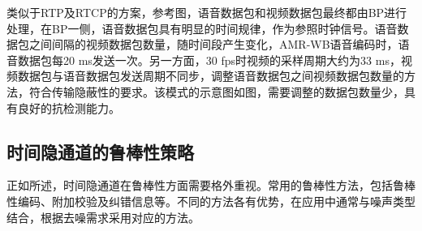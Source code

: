 类似于RTP及RTCP的方案，参考图，语音数据包和视频数据包最终都由BP进行处理，在BP一侧，语音数据包具有明显的时间规律，作为参照时钟信号。语音数据包之间间隔的视频数据包数量，随时间段产生变化，AMR-WB语音编码时，语音数据包每20 ms发送一次。另一方面，30 fps时视频的采样周期大约为33 ms，视频数据包与语音数据包发送周期不同步，调整语音数据包之间视频数据包数量的方法，符合传输隐蔽性的要求。该模式的示意图如图，需要调整的数据包数量少，具有良好的抗检测能力。

\subsection{时间隐通道的鲁棒性策略}
\label{chap:backinfo:ctc:robustness}
正如所述，时间隐通道在鲁棒性方面需要格外重视。常用的鲁棒性方法，包括鲁棒性编码、附加校验及纠错信息等。不同的方法各有优势，在应用中通常与噪声类型结合，根据去噪需求采用对应的方法。



